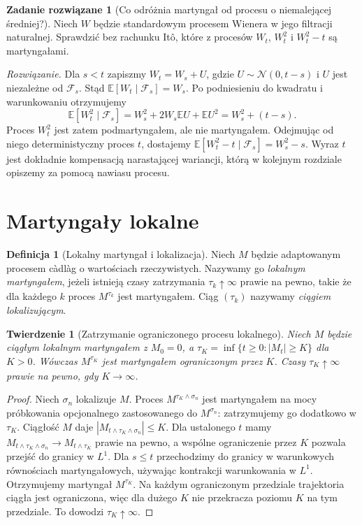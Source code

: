 \documentclass[11pt,a4paper,oneside]{report}
\numberwithin{equation}{chapter}
\theoremstyle{plain}
\newtheorem{twierdzenie}{Twierdzenie}[chapter]
\theoremstyle{definition}
\newtheorem{definicja}{Definicja}[chapter]
\newtheorem{zadanie}{Zadanie rozwiązane}[chapter]
\theoremstyle{remark}
\newcommand{\E}{\mathbb{E}}
\newcommand{\calF}{\mathcal{F}}
\newcommand{\Normal}{\mathcal{N}}
\begin{document}
\begin{zadanie}[Co odróżnia martyngał od procesu o niemalejącej średniej?]
Niech $W$ będzie standardowym procesem Wienera w jego
filtracji naturalnej. Sprawdzić bez rachunku It\^o, które
z procesów $W_t$, $W_t^2$ i $W_t^2-t$ są martyngałami.

\emph{Rozwiązanie.} Dla $s<t$ zapiszmy
$W_t=W_s+U$, gdzie $U\sim\Normal(0,t-s)$
i $U$ jest niezależne od $\calF_s$.
Stąd $\E[W_t\mid\calF_s]=W_s$.
Po podniesieniu do kwadratu i warunkowaniu otrzymujemy
\[
\E[W_t^2\mid\calF_s]
=W_s^2+2W_s\E U+\E U^2=W_s^2+(t-s).
\]
Proces $W_t^2$ jest zatem podmartyngałem, ale nie
martyngałem. Odejmując od niego deterministyczny
proces $t$, dostajemy
$\E[W_t^2-t\mid\calF_s]=W_s^2-s$.
Wyraz $t$ jest dokładnie kompensacją narastającej
wariancji, którą w kolejnym rozdziale opiszemy za
pomocą nawiasu procesu.
\end{zadanie}

\section{Martyngały lokalne}
\begin{definicja}[Lokalny martyngał i lokalizacja]
Niech $M$ będzie adaptowanym procesem c\`adl\`ag o
wartościach rzeczywistych. Nazywamy go \emph{lokalnym
martyngałem}, jeżeli istnieją czasy zatrzymania
$\tau_k\uparrow\infty$ prawie na pewno, takie że dla
każdego $k$ proces $M^{\tau_k}$ jest martyngałem.
Ciąg $(\tau_k)$ nazywamy \emph{ciągiem lokalizującym}.
\end{definicja}

\begin{twierdzenie}[Zatrzymanie ograniczonego procesu lokalnego]
Niech $M$ będzie ciągłym lokalnym martyngałem z $M_0=0$,
a $\tau_K=\inf\{t\ge0:|M_t|\ge K\}$ dla $K>0$.
Wówczas $M^{\tau_K}$ jest martyngałem ograniczonym
przez $K$. Czasy $\tau_K\uparrow\infty$ prawie na pewno,
gdy $K\to\infty$.
\end{twierdzenie}
\begin{proof}
Niech $\sigma_n$ lokalizuje $M$. Proces
$M^{\tau_K\wedge\sigma_n}$ jest martyngałem na mocy
próbkowania opcjonalnego zastosowanego do
$M^{\sigma_n}$: zatrzymujemy go dodatkowo w $\tau_K$.
Ciągłość $M$ daje $|M_{t\wedge\tau_K\wedge\sigma_n}|\le K$.
Dla ustalonego $t$ mamy
$M_{t\wedge\tau_K\wedge\sigma_n}\to M_{t\wedge\tau_K}$
prawie na pewno, a wspólne ograniczenie przez $K$
pozwala przejść do granicy w $L^1$.
Dla $s\le t$ przechodzimy do granicy w warunkowych
równościach martyngałowych, używając kontrakcji warunkowania
w $L^1$. Otrzymujemy martyngał $M^{\tau_K}$.
Na każdym ograniczonym przedziale trajektoria ciągła jest
ograniczona, więc dla dużego $K$ nie przekracza poziomu
$K$ na tym przedziale. To dowodzi $\tau_K\uparrow\infty$.
\end{proof}
\end{document}
